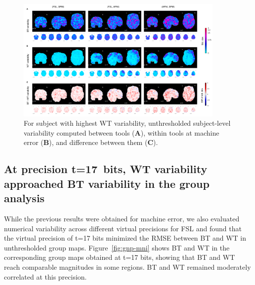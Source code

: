 \documentclass[11pt,onecolumn]{article}
\begin{document}
\begin{figure}[ht]
    \centering
    \includegraphics[width=0.9\textwidth]{figures/std/sbj05-std.png}
    \caption{For subject with highest WT variability,
    unthresholded subject-level variability computed between tools (\textbf{A}), within tools at machine error (\textbf{B}),
     and difference between them (\textbf{C}).}
  \label{fig:unthresh-maps-sbj}
\end{figure}

\subsection{At precision t=17~bits, WT variability approached BT variability in the group analysis}

While the previous results were obtained for machine error, we also
evaluated numerical variability across different virtual precisions for FSL
and found that the virtual precision of t=17 bits minimized the RMSE
between BT and WT in unthresholded group maps. Figure~\ref{fig:gnp-mni} shows BT
and WT in the corresponding group maps obtained at t=17 bits, showing that
BT and WT reach comparable magnitudes in some regions. BT and WT remained
moderately correlated at this precision. 
  
\end{document}
